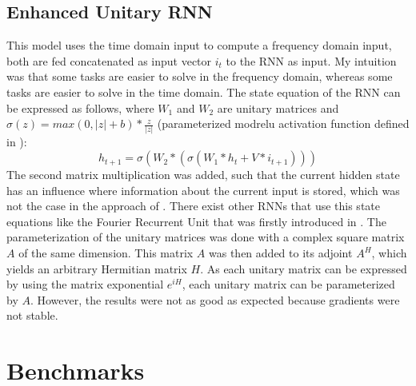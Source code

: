 \documentclass[draft,final]{vutinfth} %
\begin{document}
    \section{Enhanced Unitary RNN} \label{Enhanced Unitary RNN}
    This model uses the time domain input to compute a frequency domain input, both are fed concatenated as input vector $i_t$ to the RNN as input.
    My intuition was that some tasks are easier to solve in the frequency domain, whereas some tasks are easier to solve in the time domain.
    The state equation of the RNN can be expressed as follows, where $W_1$ and $W_2$ are unitary matrices and $\sigma(z) = max(0,|z|+b)*\frac{z}{|z|}$ (parameterized modrelu activation function defined in \cite{UnitaryRNNs}):
    \begin{equation}
        h_{t+1} = \sigma(W_2 * (\sigma(W_1 * h_t + V * i_{t+1})))
    \end{equation}
    The second matrix multiplication was added, such that the current hidden state has an influence where information about the current input is stored, which was not the case in the approach of \cite{UnitaryRNNs}.
    There exist other RNNs that use this state equations like the Fourier Recurrent Unit that was firstly introduced in \cite{FRU}.
    The parameterization of the unitary matrices was done with a complex square matrix $A$ of the same dimension.
    This matrix $A$ was then added to its adjoint $A^H$, which yields an arbitrary Hermitian matrix $H$.
    As each unitary matrix can be expressed by using the matrix exponential $e^{iH}$, each unitary matrix can be parameterized by $A$.
    However, the results were not as good as expected because gradients were not stable.


    \chapter{Benchmarks}
\end{document}
